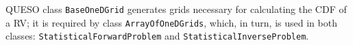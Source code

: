 QUESO class \verb+BaseOneDGrid+ generates grids necessary for calculating the CDF of a RV; it is required by class \verb+ArrayOfOneDGrids+, which, in turn, is used in both classes: \linebreak \verb+StatisticalForwardProblem+ and \verb+StatisticalInverseProblem+.

% 
% 
% 



